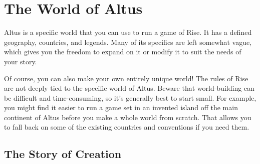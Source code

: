 \chapter{The World of Altus}

Altus is a specific world that you can use to run a game of Rise.
It has a defined geography, countries, and legends.
Many of its specifics are left somewhat vague, which gives you the freedom to expand on it or modify it to suit the needs of your story.

Of course, you can also make your own entirely unique world!
The rules of Rise are not deeply tied to the specific world of Altus.
Beware that world-building can be difficult and time-consuming, so it's generally best to start small.
For example, you might find it easier to run a game set in an invented island off the main continent of Altus before you make a whole world from scratch.
That allows you to fall back on some of the existing countries and conventions if you need them.

\section{The Story of Creation}

    

